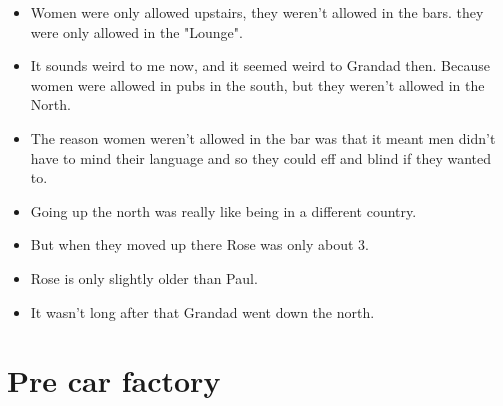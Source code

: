 \documentclass[10pt,twocolumn,letterpaper]{article}
\begin{document}
\begin{itemize}
    \item Women were only allowed upstairs, they weren't allowed in the bars. they were only allowed in the "Lounge".
    \item It sounds weird to me now, and it seemed weird to Grandad then. Because women were allowed in pubs in the south, but they weren't allowed in the North.
    \item The reason women weren't allowed in the bar was that it meant men didn't have to mind their language and so they could eff and blind if they wanted to.
    \item Going up the north was really like being in a different country.
    \item But when they moved up there Rose was only about 3.
    \item Rose is only slightly older than Paul.
    \item It wasn't long after that Grandad went down the north.
\end{itemize}


\section{Pre car factory}
\end{document}
